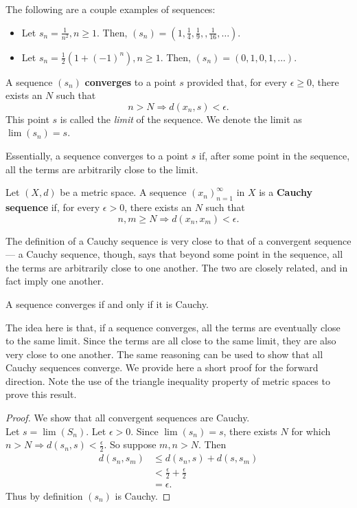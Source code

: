 \begin{example}
The following are a couple examples of sequences:
\begin{itemize}
\item Let $s_n = \frac{1}{n^2}, n\geq 1$.  Then, $(s_n) = (1, \frac{1}{4}, \frac{1}{9}, , \frac{1}{16}, \dots)$.
\item Let $s_n = \frac{1}{2}(1 + (-1)^n), n \geq 1$.  Then, $(s_n) = (0,1,0,1,\dots)$.
\end{itemize}
\end{example}

\begin{defn}
A sequence $(s_n)$ \textbf{converges} to a point $s$ provided that, for every $\epsilon \geq 0$, there exists an $N$ such that
\[n > N \Rightarrow d(x_n, s) < \epsilon.\]
This point $s$ is called the \textit{limit} of the sequence.  We denote the limit as $\lim(s_n) = s$.
\end{defn}

Essentially, a sequence converges to a point $s$ if, after some point in the sequence, all the terms are arbitrarily close to the limit.

\begin{defn}
Let $(X,d)$ be a metric space.  A sequence $(x_n)_{n=1}^\infty$ in $X$ is a \textbf{Cauchy sequence} if, for every $\epsilon > 0$, there exists an $N$ such that
\[n,m \geq N \Rightarrow d(x_n, x_m) < \epsilon.\]
\end{defn}

The definition of a Cauchy sequence is very close to that of a convergent sequence --- a Cauchy sequence, though, says that beyond some point in the sequence, all the terms are arbitrarily close to one another.  The two are closely related, and in fact imply one another.

\begin{theorem}
A sequence converges if and only if it is Cauchy.
\end{theorem}

The idea here is that, if a sequence converges, all the terms are eventually close to the same limit.  Since the terms are all close to the same limit, they are also very close to one another.  The same reasoning can be used to show that all Cauchy sequences converge.  We provide here a short proof for the forward direction.  Note the use of the triangle inequality property of metric spaces to prove this result.

\begin{proof}
We show that all convergent sequences are Cauchy.\\
Let $s = \lim(S_n)$.  Let $\epsilon > 0$.  Since $\lim(s_n) = s$, there exists $N$ for which $n > N \Rightarrow d(s_n, s) < \frac{\epsilon}{2}$.  So suppose $m,n > N$.  Then \begin{align*}
d(s_n, s_m) &\leq d(s_n, s) + d(s, s_m)\\
&< \frac{\epsilon}{2} + \frac{\epsilon}{2}\\
&= \epsilon.
\end{align*}
Thus by definition $(s_n)$ is Cauchy.
\end{proof}

